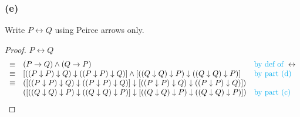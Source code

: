 \documentclass[14pt]{extarticle}
\newcommand{\bic}{\leftrightarrow}
\begin{document}
\subsubsection{(e)}
Write $P \bic Q$ using Peirce arrows only.

\begin{proof}
$P \bic Q$
$$
\begin{array}{cll}
\equiv & (P \to Q) \wedge (Q \to P) & \text{\color{cyan}by def of } \bic \\
\equiv & [((P \downarrow P) \downarrow Q) \downarrow ((P \downarrow P) \downarrow Q)] \wedge [((Q \downarrow Q) \downarrow P) \downarrow ((Q \downarrow Q) \downarrow P)] & \text{\color{cyan}by part (d)} \\
\equiv & ([((P \downarrow P) \downarrow Q) \downarrow ((P \downarrow P) \downarrow Q)] \downarrow [((P \downarrow P) \downarrow Q) \downarrow ((P \downarrow P) \downarrow Q)])\\ 
& ([((Q \downarrow Q) \downarrow P) \downarrow ((Q \downarrow Q) \downarrow P)] \downarrow [((Q \downarrow Q) \downarrow P) \downarrow ((Q \downarrow Q) \downarrow P)]) & \text{\color{cyan}by part (c)} \\
\end{array}
$$
\end{proof}
\end{document}
